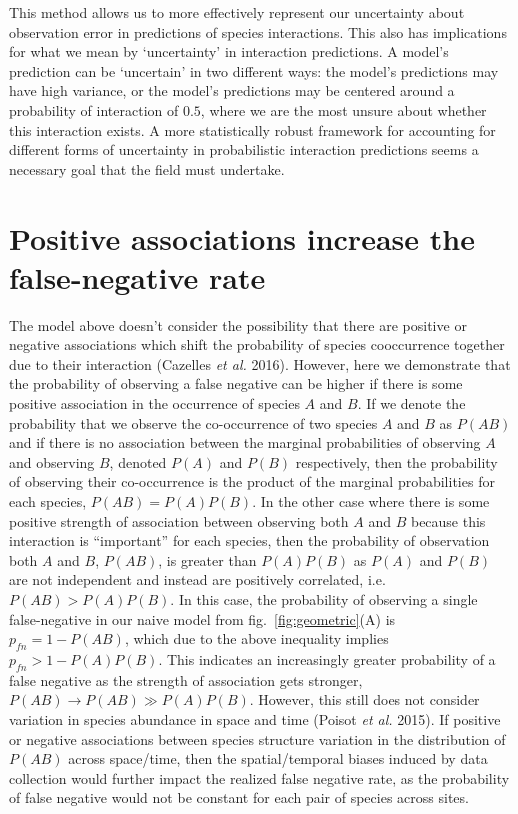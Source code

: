 \documentclass[11pt]{article}
\begin{document}
This method allows us to more effectively represent our uncertainty
about observation error in predictions of species interactions. This
also has implications for what we mean by `uncertainty' in interaction
predictions. A model's prediction can be `uncertain' in two different
ways: the model's predictions may have high variance, or the model's
predictions may be centered around a probability of interaction of
\(0.5\), where we are the most unsure about whether this interaction
exists. A more statistically robust framework for accounting for
different forms of uncertainty in probabilistic interaction predictions
seems a necessary goal that the field must undertake.

\hypertarget{positive-associations-increase-the-false-negative-rate}{%
\section{Positive associations increase the false-negative
rate}\label{positive-associations-increase-the-false-negative-rate}}

The model above doesn't consider the possibility that there are positive
or negative associations which shift the probability of species
cooccurrence together due to their interaction (Cazelles \emph{et al.}
2016). However, here we demonstrate that the probability of observing a
false negative can be higher if there is some positive association in
the occurrence of species \(A\) and \(B\). If we denote the probability
that we observe the co-occurrence of two species \(A\) and \(B\) as
\(P(AB)\) and if there is no association between the marginal
probabilities of observing \(A\) and observing \(B\), denoted \(P(A)\)
and \(P(B)\) respectively, then the probability of observing their
co-occurrence is the product of the marginal probabilities for each
species, \(P(AB) = P(A)P(B)\). In the other case where there is some
positive strength of association between observing both \(A\) and \(B\)
because this interaction is ``important'' for each species, then the
probability of observation both \(A\) and \(B\), \(P(AB)\), is greater
than \(P(A)P(B)\) as \(P(A)\) and \(P(B)\) are not independent and
instead are positively correlated, i.e.~\(P(AB)> P(A)P(B)\). In this
case, the probability of observing a single false-negative in our naive
model from fig.~\ref{fig:geometric}(A) is \(p_{fn}= 1-P(AB)\), which due
to the above inequality implies \(p_{fn}>1-P(A)P(B)\). This indicates an
increasingly greater probability of a false negative as the strength of
association gets stronger, \(P(AB) \to P(AB) \gg P(A)P(B)\). However,
this still does not consider variation in species abundance in space and
time (Poisot \emph{et al.} 2015). If positive or negative associations
between species structure variation in the distribution of \(P(AB)\)
across space/time, then the spatial/temporal biases induced by data
collection would further impact the realized false negative rate, as the
probability of false negative would not be constant for each pair of
species across sites.
\end{document}
